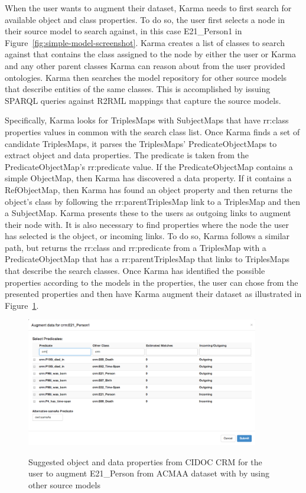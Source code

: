 When the user wants to augment their dataset, Karma needs to first search for available object and class properties.  
To do so, the user first selects a node in their source model to search against, in this case E21\_Person1 in Figure~\ref{fig:simple-model-screenshot}.
Karma creates a list of classes to search against that contains the class assigned to the node by either the user or Karma and any other parent classes Karma can reason about from the user provided ontologies.  
Karma then searches the model repository for other source models that describe entities of the same classes.  This is accomplished by issuing SPARQL queries against R2RML mappings that capture the source models.  

Specifically, Karma looks for TriplesMaps with SubjectMaps that have rr:class properties values in common with the search class list.  
Once Karma finds a set of candidate TriplesMaps, it parses the TriplesMaps' PredicateObjectMaps to extract object and data properties.  
The predicate is taken from the PredicateObjectMap's rr:predicate value.  
If the PredicateObjectMap contains a simple ObjectMap, then Karma has discovered a data property.  
If it contains a RefObjectMap, then Karma has found an object property and then returns the object's class by following the rr:parentTriplesMap link to a TriplesMap and then a SubjectMap.  
Karma presents these to the users as outgoing links to augment their node with.  
It is also necessary to find properties where the node the user has selected is the object, or incoming links.  
To do so, Karma follows a similar path, but returns the rr:class and rr:predicate from a TriplesMap with a PredicateObjectMap that has a rr:parentTriplesMap that links to TriplesMaps that describe the search classes. 
Once Karma has identified the possible properties according to the models in the properties, the user can chose from the presented properties and then have Karma augment their dataset as illustrated in Figure~\ref{fig:search-screenshot}.

\begin{figure}
\begin{center}
\includegraphics[width=4.0in]{5-search.png}
\vspace{-3mm}
\caption{Suggested object and data properties from CIDOC CRM for the user to augment E21\_Person from ACMAA dataset with by using other source models}
\vspace{-2mm}
\label{fig:search-screenshot}
\end{center}
\vspace{-1.5em}
\end{figure}



